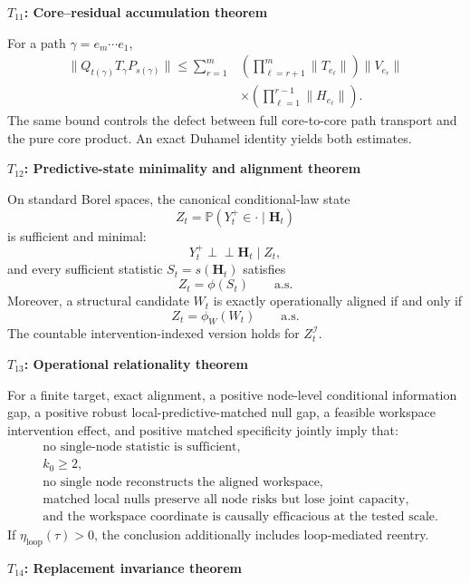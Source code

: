 \documentclass[11pt,letterpaper]{article}
\newcommand{\indep}{\perp\!\!\!\perp}
\newcommand{\subtopic}[1]{%
 \vspace{0.45em}
 {\bfseries\color{AccentColor} #1\par}
}
\theoremstyle{plain}
\theoremstyle{definition}
\begin{document}
\subtopic{\(T_{11}\): Core--residual accumulation theorem }

For a path \(\gamma=e_m\cdots e_1\),
\[
\boxed{
\begin{aligned}
\|Q_{t(\gamma)}T_\gamma P_{s(\gamma)}\|
\leq
\sum_{r=1}^{m}
&\left(
\prod_{\ell=r+1}^{m}\|T_{e_\ell}\|
\right)
\|V_{e_r}\|\\
&\times
\left(
\prod_{\ell=1}^{r-1}\|H_{e_\ell}\|
\right).
\end{aligned}
}
\]
The same bound controls the defect between full core-to-core path transport and
the pure core product. An exact Duhamel
identity yields both estimates.

\subtopic{\(T_{12}\): Predictive-state minimality and alignment theorem }

On standard Borel spaces, the canonical conditional-law state
\[
Z_t
=
\mathbb P(Y_t^+\in\cdot\mid\mathbf H_t)
\]
is sufficient and minimal:
\[
Y_t^+\indep\mathbf H_t\mid Z_t,
\]
and every sufficient statistic \(S_t=s(\mathbf H_t)\) satisfies
\[
Z_t=\phi(S_t)
\qquad\text{a.s.}
\]
Moreover, a structural candidate \(W_t\) is exactly operationally aligned if
and only if
\[
Z_t=\phi_W(W_t)
\qquad\text{a.s.}
\]
The countable intervention-indexed version holds for
\(Z_t^{\mathcal I}\).

\subtopic{\(T_{13}\): Operational relationality theorem }

For a finite target, exact alignment, a positive node-level conditional
information gap, a positive robust local-predictive-matched null gap, a feasible
workspace intervention effect, and positive matched specificity jointly imply
that:
\[
\begin{aligned}
&\text{no single-node statistic is sufficient},\\
&k_0\geq2,\\
&\text{no single node reconstructs the aligned workspace},\\
&\text{matched local nulls preserve all node risks but lose joint capacity},\\
&\text{and the workspace coordinate is causally efficacious at the tested scale.}
\end{aligned}
\]
If \(\eta_{\mathrm{loop}}(\tau)>0\), the conclusion additionally includes
loop-mediated reentry.

\subtopic{\(T_{14}\): Replacement invariance theorem }
\end{document}
